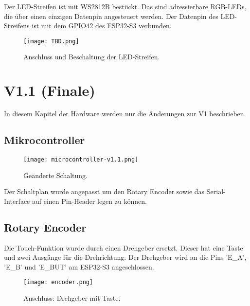         Der LED-Streifen ist mit WS2812B bestückt. Das sind adressierbare RGB-LEDs, 
        die über einen einzigen Datenpin angesteuert werden. 
        Der Datenpin des LED-Streifens ist mit dem GPIO42 des ESP32-S3 verbunden. 

            \begin{figure}[h!]
                \centering
                \texttt{[image: TBD.png]}
                \caption{Anschluss und Beschaltung der LED-Streifen.}
                \label{fig:led_strip}
            \end{figure}




 
    \newpage
    \section{V1.1 (Finale)}       
    In diesem Kapitel der Hardware werden nur die Änderungen zur V1 beschrieben. 

        \subsection{Mikrocontroller}
        

            \begin{figure}[h!]
                \centering
                \texttt{[image: microcontroller-v1.1.png]}
                \caption{Geänderte Schaltung.}
                \label{fig:sch5}

            \end{figure}

        Der Schaltplan wurde angepasst um den Rotary Encoder sowie das Serial-Interface auf
        einen Pin-Header legen zu können.

        \newpage
        \subsection{Rotary Encoder}
        Die Touch-Funktion wurde durch einen Drehgeber ersetzt. Dieser hat eine Taste und
        zwei Ausgänge für die Drehrichtung. Der Drehgeber wird an die Pins 'E\_A', 'E\_B' und 'E\_BUT'
        am ESP32-S3 angeschlossen. 

            \begin{figure}[h!]
                \centering
                \texttt{[image: encoder.png]}
                \caption{Anschluss: Drehgeber mit Taste.}
                \label{fig:sch6}

            \end{figure}

